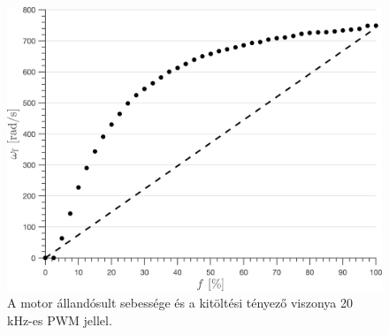\begin{figure}[b!]
    \begin{center}
    \includegraphics[width=14cm]{images/motor_pwm_response20.png}
    \caption{A motor állandósult sebessége és a kitöltési tényező viszonya 20 kHz-es PWM jellel.}\label{fig:motor_response_20khz}
    \end{center}
\end{figure}

